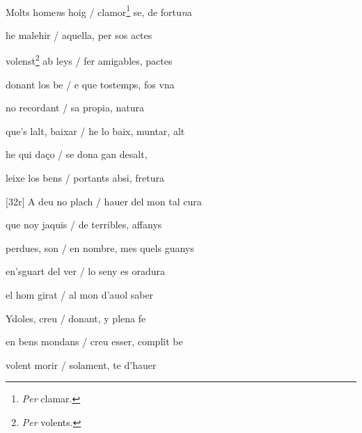 \documentclass[12pt]{article}
\renewcommand{\espaiAbansEtiquetaPoema}{\vspace{0ex}}
\begin{document}
\begin{estrofa}

\espaiAbansEtiquetaPoema

\\

\end{estrofa}


\begin{estrofa}

 Molts home\textit{n}s hoig / clamor\footnote{\textit{Per }clamar.} se, de
fortu\textit{n}a

 he malehir / aquella, per sos actes

 volenst\footnote{\textit{Per }volents.} ab leys \cite{ref32} / fer amigables,
pactes

 donant los be / e que tostemps, fos vna

 no recordant / sa propia, natura

 que's lalt, baixar / he lo baix, muntar, alt

 he qui da\c{c}o / se dona gan desalt,

 leixe los bens / portants absi, fretura

\end{estrofa}



\begin{estrofa}

 [32r] A deu no plach / hauer del mon tal cura

 que noy jaquis / de terribles, affanys

 perdues, son / en nombre, mes quels guanys

 en'sguart del ver / lo seny es oradura

 el hom girat / al mon d'auol saber

 Ydoles, creu / donant, y plena fe

 en bens mondans / creu esser, complit be

 volent morir / solament, te d'hauer

\end{estrofa}
\end{document}
